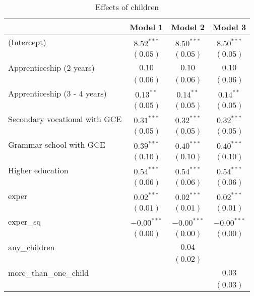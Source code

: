 
\begin{table}
\caption{Effects of children}
\begin{center}
\begin{tabular}{l c c c}
\hline
 & Model 1 & Model 2 & Model 3 \\
\hline
(Intercept)                   & $8.52^{***}$  & $8.50^{***}$  & $8.50^{***}$  \\
                              & $(0.05)$      & $(0.05)$      & $(0.05)$      \\
Apprenticeship (2 years)      & $0.10$        & $0.10$        & $0.10$        \\
                              & $(0.06)$      & $(0.06)$      & $(0.06)$      \\
Apprenticeship (3 - 4 years)  & $0.13^{**}$   & $0.14^{**}$   & $0.14^{**}$   \\
                              & $(0.05)$      & $(0.05)$      & $(0.05)$      \\
Secondary vocational with GCE & $0.31^{***}$  & $0.32^{***}$  & $0.32^{***}$  \\
                              & $(0.05)$      & $(0.05)$      & $(0.05)$      \\
Grammar school with GCE       & $0.39^{***}$  & $0.40^{***}$  & $0.40^{***}$  \\
                              & $(0.10)$      & $(0.10)$      & $(0.10)$      \\
Higher education              & $0.54^{***}$  & $0.54^{***}$  & $0.54^{***}$  \\
                              & $(0.06)$      & $(0.06)$      & $(0.06)$      \\
exper                         & $0.02^{***}$  & $0.02^{***}$  & $0.02^{***}$  \\
                              & $(0.01)$      & $(0.01)$      & $(0.01)$      \\
exper\_sq                     & $-0.00^{***}$ & $-0.00^{***}$ & $-0.00^{***}$ \\
                              & $(0.00)$      & $(0.00)$      & $(0.00)$      \\
any\_children                 &               & $0.04$        &               \\
                              &               & $(0.02)$      &               \\
more\_than\_one\_child        &               &               & $0.03$        \\
                              &               &               & $(0.03)$      \\

\end{tabular}
\end{center}
\end{table}
